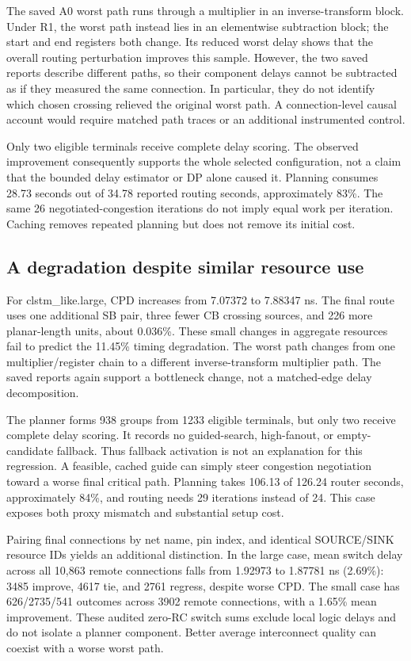 \documentclass[conference,10pt]{IEEEtran}
\begin{document}
The saved A0 worst path runs through a multiplier in an inverse-transform block. Under R1, the worst path instead lies in an elementwise subtraction block; the start and end registers both change. Its reduced worst delay shows that the overall routing perturbation improves this sample. However, the two saved reports describe different paths, so their component delays cannot be subtracted as if they measured the same connection. In particular, they do not identify which chosen crossing relieved the original worst path. A connection-level causal account would require matched path traces or an additional instrumented control.

Only two eligible terminals receive complete delay scoring. The observed improvement consequently supports the whole selected configuration, not a claim that the bounded delay estimator or DP alone caused it. Planning consumes 28.73 seconds out of 34.78 reported routing seconds, approximately 83\%. The same 26 negotiated-congestion iterations do not imply equal work per iteration. Caching removes repeated planning but does not remove its initial cost.

\subsection{A degradation despite similar resource use}
For clstm\_like.large, CPD increases from 7.07372 to 7.88347 ns. The final route uses one additional SB pair, three fewer CB crossing sources, and 226 more planar-length units, about 0.036\%. These small changes in aggregate resources fail to predict the 11.45\% timing degradation. The worst path changes from one multiplier/register chain to a different inverse-transform multiplier path. The saved reports again support a bottleneck change, not a matched-edge delay decomposition.

The planner forms 938 groups from 1233 eligible terminals, but only two receive complete delay scoring. It records no guided-search, high-fanout, or empty-candidate fallback. Thus fallback activation is not an explanation for this regression. A feasible, cached guide can simply steer congestion negotiation toward a worse final critical path. Planning takes 106.13 of 126.24 router seconds, approximately 84\%, and routing needs 29 iterations instead of 24. This case exposes both proxy mismatch and substantial setup cost.

Pairing final connections by net name, pin index, and identical SOURCE/SINK resource IDs yields an additional distinction. In the large case, mean switch delay across all 10,863 remote connections falls from 1.92973 to 1.87781 ns (2.69\%): 3485 improve, 4617 tie, and 2761 regress, despite worse CPD. The small case has 626/2735/541 outcomes across 3902 remote connections, with a 1.65\% mean improvement. These audited zero-RC switch sums exclude local logic delays and do not isolate a planner component. Better average interconnect quality can coexist with a worse worst path.
\end{document}
